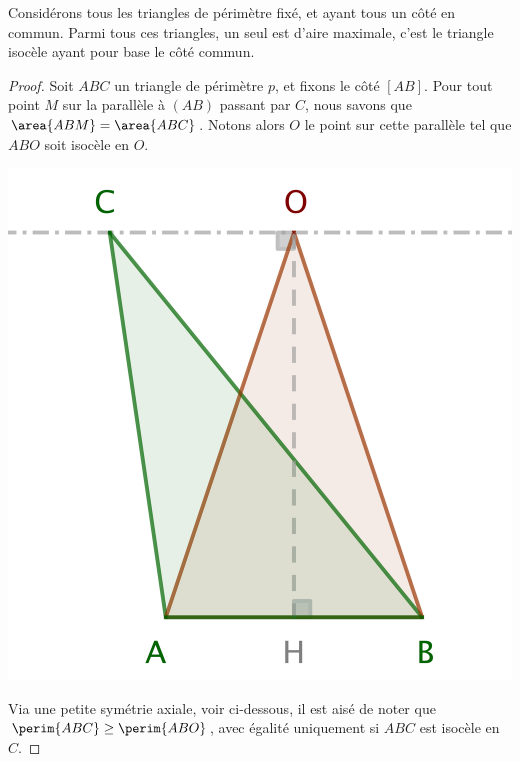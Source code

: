 \begin{fact} \label{tri-one-side-fixed}
	Considérons tous les triangles de périmètre fixé, et ayant tous un côté en commun.
	Parmi tous ces triangles, un seul est d'aire maximale, c'est le triangle isocèle ayant pour base le côté commun.
\end{fact}


\begin{proof}
	Soit $ABC$ un triangle de périmètre $p$, et fixons le côté $[AB]$. 
	Pour tout point $M$ sur la parallèle à $(AB)$ passant par $C$, nous savons que $\area{ABM} = \area{ABC}$. Notons alors $O$ le point sur cette parallèle tel que $ABO$ soit isocèle en $O$.

	\begin{center}
		\includegraphics[scale=.4]{content/triangle-one-side-fixed/triangle.png}
	\end{center}

	
	Via une petite symétrie axiale, voir ci-dessous, il est aisé de noter que $\perim{ABC} \geq \perim{ABO}$, avec égalité uniquement si $ABC$ est isocèle en $C$. 
	

\end{proof}
